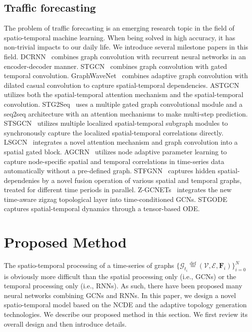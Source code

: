 \documentclass[letterpaper]{article} \usepackage{aaai22}  \usepackage{times}  \usepackage{helvet}  \usepackage{courier}  \usepackage[hyphens]{url}  \usepackage{graphicx} \urlstyle{rm} \def\UrlFont{\rm}  \usepackage{natbib}  \usepackage{caption} \DeclareCaptionStyle{ruled}{labelfont=normalfont,labelsep=colon,strut=off} \frenchspacing  \setlength{\pdfpagewidth}{8.5in}  \setlength{\pdfpageheight}{11in}  \usepackage{stfloats}
\begin{document}
\subsection{Traffic forecasting}
The problem of traffic forecasting is an emerging research topic in the field of spatio-temporal machine learning. When being solved in high accuracy, it has non-trivial impacts to our daily life. We introduce several milestone papers in this field. DCRNN~\cite{li2018dcrnn_traffic} combines graph convolution with recurrent neural networks in an encoder-decoder manner. STGCN~\cite{bing2018stgcn} combines graph convolution with gated temporal convolution. GraphWaveNet~\cite{wu2019graphwavenet} combines adaptive graph convolution with dilated casual convolution to capture spatial-temporal dependencies. ASTGCN~\cite{guo2019astgcn} utilizes both the spatial-temporal attention mechanism and the spatial-temporal convolution. STG2Seq~\cite{bai2019STG2Seq} uses a multiple gated graph convolutional module and a seq2seq architecture with an attention mechanisms to make multi-step prediction. STSGCN~\cite{song2020stsgcn} utilizes multiple localized spatial-temporal subgraph modules to synchronously capture the localized spatial-temporal correlations directly. LSGCN~\cite{huang2020lsgcn} integrates a novel attention mechanism and graph convolution into a spatial gated block. AGCRN~\cite{NEURIPS2020_ce1aad92} utilizes node adaptive parameter learning to capture node-specific spatial and temporal correlations in time-series data automatically without a pre-defined graph. STFGNN~\cite{li2021stfgnn} captures hidden spatial-dependenies by a novel fusion operation of various spatial and temporal graphs, treated for different time periods in parallel. Z-GCNETs~\cite{chen2021ZGCNET} integrates the new time-aware zigzag topological layer into time-conditioned GCNs. STGODE~\cite{fang2021STODE} captures spatial-temporal dynamics through a tensor-based ODE.

\section{Proposed Method}
The spatio-temporal processing of a time-series of graphs $\{\mathcal{G}_{t_i} \stackrel{\text{def}}{=} (\mathcal{V},\mathcal{E},\bm{F}_{i})\}_{i=0}^{N}$ is obviously more difficult than the spatial processing only (i.e., GCNs) or the temporal processing only (i.e., RNNs). As such, there have been proposed many neural networks combining GCNs and RNNs. In this paper, we design a novel spatio-temporal model based on the NCDE and the adaptive topology generation technologies. We describe our proposed method in this section. We first review its overall design and then introduce details.
\end{document}
